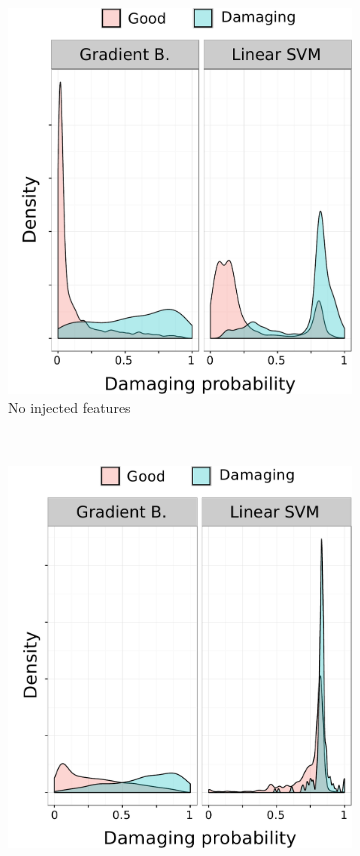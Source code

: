 \begin{figure}[h]
\centering
\begin{subfigure}[t]{.33\textwidth}
  \centering
  \includegraphics[width=.95\textwidth]{figures/natural_damaging_gb_vs_svc}
  \caption{No injected features}
  \label{fig:natural_damaging_gb_bs_svc}
\end{subfigure}~~
\begin{subfigure}[t]{.33\textwidth}
  \centering
  \includegraphics[width=.95\textwidth]{figures/anon_damaging_gb_vs_svc}

\end{subfigure}
\end{figure}
